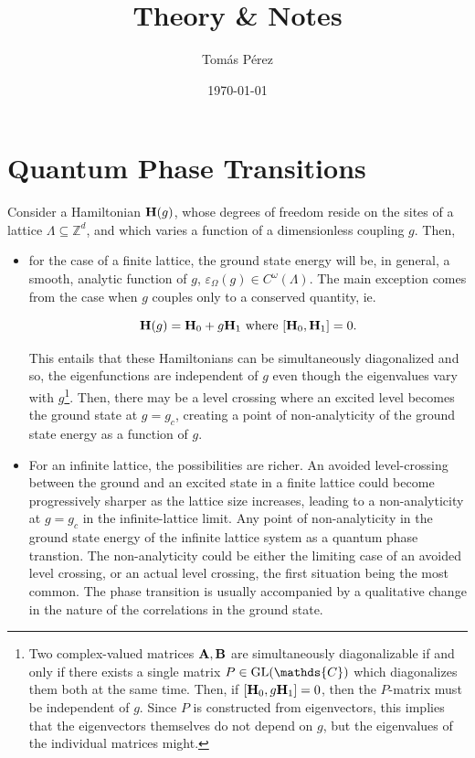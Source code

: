 \documentclass{homework}
\author{Tomás Pérez}
\date{\today}
\title{Theory \& Notes}
\begin{document}
 \maketitle

\tableofcontents

\section{\textbf{Quantum Phase Transitions}}

Consider a Hamiltonian ${\bf H}(g)$, whose degrees of freedom reside on the sites of a lattice $\Lambda \subseteq \mathds{Z}^d$, and which varies a function of a dimensionless coupling $g$. Then,

\begin{itemize}
    \item for the case of a finite lattice, the ground state energy will be, in general, a smooth, analytic function of $g$, $\varepsilon_{\Omega} (g) \in C^{\omega}(\Lambda) $. The main exception comes from the case when $g$ couples only to a conserved quantity, ie.
    
    $$
        {\bf H}(g) = {\bf H}_0 + g {\bf H}_1 \textnormal{ where } [{\bf H}_0, {\bf H}_1] = 0.  
    $$
    
    This entails that these Hamiltonians can be simultaneously diagonalized and so, the eigenfunctions are independent of $g$ even though the eigenvalues vary with $g$\footnote{Two complex-valued matrices ${\bf A}, {\bf B}$ are simultaneously diagonalizable if and only if there exists a single matrix $P \in \textnormal{GL}(\mathds{C})$ which diagonalizes them both at the same time. Then, if $[{\bf H}_0, g{\bf H}_1] = 0$, then the $P$-matrix must be independent of $g$. Since $P$ is constructed from eigenvectors, this implies that the eigenvectors themselves do not depend on $g$, but the eigenvalues of the individual matrices might.}. Then, there may be a level crossing where an excited level becomes the ground state at $g = g_c$, creating a point of non-analyticity of the ground state energy as a function of $g$. \\
    
    \item For an infinite lattice, the possibilities are richer. An avoided level-crossing between the ground and an excited state in a finite lattice could become progressively sharper as the lattice size increases, leading to a non-analyticity at $g = g_c$ in the infinite-lattice limit. Any point of non-analyticity in the ground state energy of the infinite lattice system as a quantum phase transtion. The non-analyticity could be either the limiting case of an avoided level crossing, or an actual level crossing, the first situation being the most common. The phase transition is usually accompanied by a qualitative change in the nature of the correlations in the ground state. \\
\end{itemize}
\end{document}
